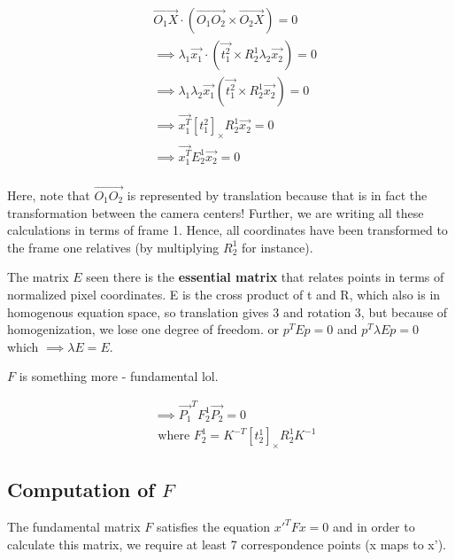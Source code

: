 \begin{equation}
\begin{split}
    &\overrightarrow{O_1X}\cdot(\overrightarrow{O_1O_2} \times \overrightarrow{O_2X}) = 0 \\
    &\implies \lambda_1\overrightarrow{x_1}\cdot(\overrightarrow{t_1^2}\times R_2^1\lambda_2\overrightarrow{x_2}) = 0 \\
    &\implies \lambda_1\lambda_2\overrightarrow{x_1}(\overrightarrow{t_1^2}\times R_2^1\overrightarrow{x_2}) = 0\\
    &\implies \overrightarrow{x_1^T}[t_1^2]_{\times}R_2^1\overrightarrow{x_2} = 0 \\
    &\implies \overrightarrow{x_1^T}E_2^1\overrightarrow{x_2} = 0 \\
\end{split}
\end{equation}

Here, note that $\overrightarrow{O_1O_2}$ is represented by translation because that is in fact the transformation between the camera centers! Further, we are writing all these calculations in terms of frame 1. Hence, all coordinates have been transformed to the frame one relatives (by multiplying $R_2^1$ for instance). 

The matrix $E$ seen there is the \textbf{essential matrix} that relates points in terms of normalized pixel coordinates. E is the cross product of t and R, which also is in homogenous equation space, so translation gives 3 and rotation 3, but because of homogenization, we lose one degree of freedom. or $p^TEp=0$ and $p^T\lambda Ep=0$ which $\implies \lambda E = E$.

$F$ is something more - fundamental lol. 

\begin{equation}
\begin{split}
    &\implies  \overrightarrow{P_1}^TF_2^1\overrightarrow{P_2} = 0 \\
    &\text{ where $F_2^1 = K^{-T}[t_2^1]_{\times}R_2^1K^{-1}$}
\end{split}
\end{equation}

\subsection{Computation of $F$}

The fundamental matrix $F$ satisfies the equation $x'^TFx = 0$ and in order to calculate this matrix, we require at least 7 correspondence points (x maps to x'). 

